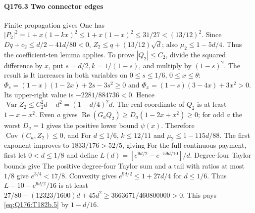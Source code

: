 \paragraph{Q176.3 Two connector edges}\label{part:Q176.3}
Finite propagation gives
One has
$|P_2|^2=\allowbreak 1+x(1-kx)^2\le\allowbreak 1+x(1-x)^2\le\allowbreak 31/27<\allowbreak (13/12)^2$.
Since $Dq+c_2\le\allowbreak  d/2-41d/80<\allowbreak 0$,
$Z_2\le\allowbreak  q+(13/12)\sqrt d$; also $\mu_2\le\allowbreak 1-5d/4$.
Thus the coefficient-ten lemma applies.
To prove $|Q_2|\le\allowbreak  C_2$, divide the squared difference by $x$,
put $s=\allowbreak d/2,\allowbreak k=\allowbreak 1/(1-s)$, and multiply by $(1-s)^2$. The result is
It increases in both variables on $0\le\allowbreak  s\le\allowbreak 1/6$, $0\le\allowbreak  x\le\allowbreak \theta$:
$\Phi_s=\allowbreak (1-x)(1-2x)+2s-3s^2\ge\allowbreak 0$ and
$\Phi_x=\allowbreak (1-s)(3-4x)+3x^2>\allowbreak 0$.
Its upper-right value is $-2281/884736<\allowbreak 0$.
Hence $\operatorname{Var}Z_2\le\allowbreak  C_2^2d-d^2=\allowbreak (1-d/4)^2d$.
The real coordinate of $Q_2$ is at least $1-x+x^2$.
Even $a$ gives $\operatorname{Re}(G_aQ_2)\ge\allowbreak  D_a(1-2x+x^2)\ge\allowbreak 0$;
for odd $a$ the worst $D_a=\allowbreak 1$ gives the positive lower bound $\psi(x)$.
Therefore $\operatorname{Cov}(C_a,\allowbreak Z_2)\le\allowbreak 0$, and
For $d\le\allowbreak 1/6$, $k\le\allowbreak 12/11$ and $\mu_2\le\allowbreak 1-115d/88$.
The first exponent improves to $1833/176>\allowbreak 52/5$, giving
For the full continuous payment, first let $0<\allowbreak d\le\allowbreak 1/8$ and define
$L(d)=\allowbreak [e^{9d/2}-e^{-59d/10}]/d$.
Degree-four Taylor bounds give
The positive degree-four Taylor sum and a tail with ratios at most $1/8$
give $e^{3/4}<\allowbreak 17/8$. Convexity gives
$e^{9d/2}\le\allowbreak 1+27d/4$ for $d\le\allowbreak 1/6$.
Thus $L-10-e^{9d/2}/16$ is at least
$27/80-(12323/1600)d+45d^2\ge\allowbreak 3663671/460800000>\allowbreak 0$.
This pays \eqref{eq:Q176:T182b.5} by $1-d/16$.
